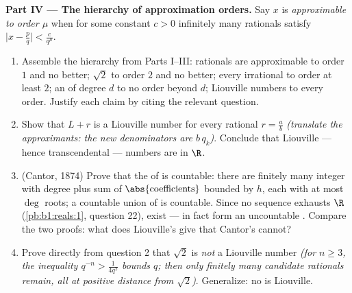 \begin{problem}
\medskip
\noindent\textbf{Part IV --- The hierarchy of approximation
orders.} Say $x$ is \emph{approximable to order $\mu$} when for
some constant $c > 0$ infinitely many rationals satisfy
$\bigl|x - \frac pq\bigr| < \frac{c}{q^{\mu}}$.
\begin{enumerate}[resume]
  \item Assemble the hierarchy from Parts I--III: rationals are
        approximable to order $1$ and no better; $\sqrt 2$ to
        order $2$ and no better; every irrational to order at
        least $2$; an  of degree $d$ to no order
        beyond $d$; Liouville numbers to every order. Justify
        each claim by citing the relevant question.
  \item Show that $L + r$ is a Liouville number for every
        rational $r = \frac ab$ \emph{(translate the
        approximants: the new denominators are $b\,q_k$)}.
        Conclude that Liouville --- hence transcendental ---
        numbers are  in $\R$.
  \item (Cantor, 1874) Prove that the  of 
        is countable: there are finitely many integer
         with degree plus sum of $\abs{\text{coefficients}}$
        bounded by $h$, each with at most $\deg$ roots; a
        countable union of  is countable. Since no
        sequence exhausts $\R$ (\cref{pb:b1:reals:1}, question
        22),  exist --- in fact form an
        uncountable . Compare the two proofs: what does
        Liouville's give that Cantor's cannot?
  \item Prove directly from question 2 that $\sqrt 2$ is
        \emph{not} a Liouville number \emph{(for $n \geq 3$,
        the inequality $q^{-n} > \frac{1}{4q^2}$ bounds $q$;
        then only finitely many candidate rationals remain, all
        at positive distance from $\sqrt2$)}. Generalize:
        no  is Liouville.
\end{enumerate}


\end{problem}
